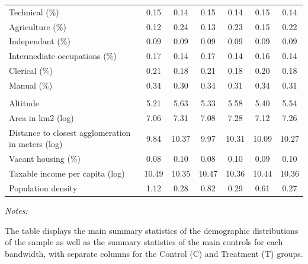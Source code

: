\begin{table}[!h]
{\begin{threeparttable}
\begin{tabular}[t]{lcccccc}
\hspace{1em}\hspace{1em}\hspace{1em}Technical (\%) & 0.15 & 0.14 & 0.15 & 0.14 & 0.15 & 0.14\\
\hspace{1em}\hspace{1em}Agriculture (\%) & 0.12 & 0.24 & 0.13 & 0.23 & 0.15 & 0.22\\
\hspace{1em}\hspace{1em}Independant (\%) & 0.09 & 0.09 & 0.09 & 0.09 & 0.09 & 0.09\\
\hspace{1em}\hspace{1em}Intermediate occupations (\%) & 0.17 & 0.14 & 0.17 & 0.14 & 0.16 & 0.14\\
\hspace{1em}\hspace{1em}Clerical (\%) & 0.21 & 0.18 & 0.21 & 0.18 & 0.20 & 0.18\\
\hspace{1em}\hspace{1em}Manual (\%) & 0.34 & 0.30 & 0.34 & 0.31 & 0.34 & 0.31\\
\addlinespace[0.3em]
\multicolumn{7}{l}{\textit{Geography}}\\
\hspace{1em}\hspace{1em}Altitude & 5.21 & 5.63 & 5.33 & 5.58 & 5.40 & 5.54\\
\hspace{1em}\hspace{1em}Area in km2 (log) & 7.06 & 7.31 & 7.08 & 7.28 & 7.12 & 7.26\\
\hspace{1em}\hspace{1em}Distance to closest agglomeration in meters (log) & 9.84 & 10.37 & 9.97 & 10.31 & 10.09 & 10.27\\
\hspace{1em}Vacant housing (\%) & 0.08 & 0.10 & 0.08 & 0.10 & 0.09 & 0.10\\
\hspace{1em}Taxable income per capita  (log) & 10.49 & 10.35 & 10.47 & 10.36 & 10.44 & 10.36\\
\hspace{1em}Population density & 1.12 & 0.28 & 0.82 & 0.29 & 0.61 & 0.27\\
\bottomrule
\end{tabular}
\begin{tablenotes}[para]
\item \textit{Notes:}
\item The table displays the main summary statistics of the demographic distributions of the sample as well as the summary statistics of the main controls for each bandwidth, with separate columns for the Control (C) and Treatment (T) groups.
\end{tablenotes}
\end{threeparttable}}
\end{table}

